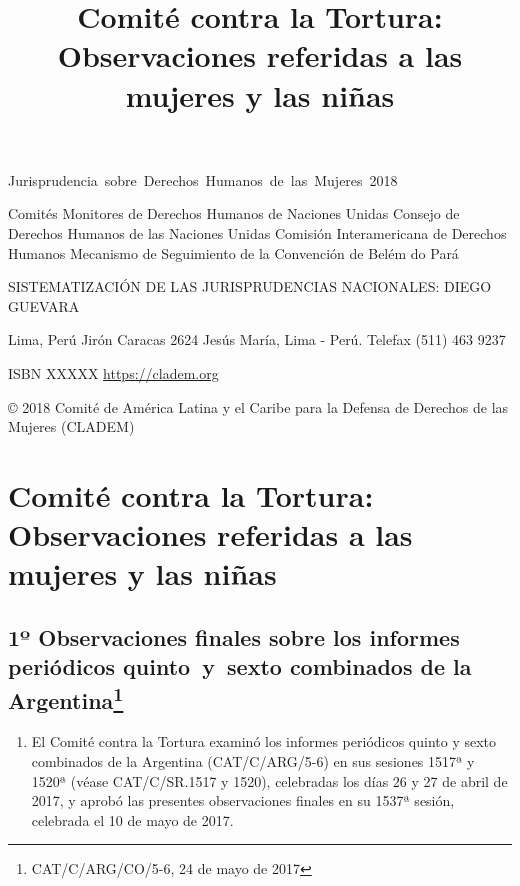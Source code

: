 \documentclass[10pt,twoside,spanish,a5paper,]{book}
\title{Comité contra la Tortura: Observaciones referidas a las mujeres y las
niñas}
\date{}
\providecommand{\tightlist}{%
  \setlength{\itemsep}{0pt}\setlength{\parskip}{0pt}}
\newcommand{\copyleft}{\reflectbox{©}}
\begin{document}
\maketitle

\newpage
\thispagestyle{empty}

\begin{flushleft}\hbox{\Large{Jurisprudencia sobre Derechos Humanos de las Mujeres 2018}}

Comités Monitores de Derechos Humanos de Naciones Unidas
Consejo de Derechos Humanos de las Naciones Unidas
Comisión Interamericana de Derechos Humanos
Mecanismo de Seguimiento de la Convención de Belém do Pará

SISTEMATIZACIÓN DE LAS JURISPRUDENCIAS NACIONALES: DIEGO GUEVARA

Lima, Perú
Jirón Caracas 2624 Jesús María, Lima - Perú. Telefax (511) 463 9237

\vfill
\copyleft  \the\year ISBN XXXXX
\url{https://cladem.org}

© 2018 Comité de América Latina y el Caribe para la Defensa de Derechos de las Mujeres (CLADEM)

\end{flushleft}
\newpage

{
\setcounter{tocdepth}{2}
\tableofcontents
}
\hypertarget{comituxe9-contra-la-tortura-observaciones-referidas-a-las-mujeres-y-las-niuxf1as}{%
\chapter{Comité contra la Tortura: Observaciones referidas a las mujeres
y las
niñas}\label{comituxe9-contra-la-tortura-observaciones-referidas-a-las-mujeres-y-las-niuxf1as}}

\hypertarget{uxba-observaciones-finales-sobre-los-informes-periuxf3dicos-quintoysexto-combinados-de-la-argentina50}{%
\section[1º Observaciones finales sobre los informes periódicos
quinto~y~sexto combinados de la Argentina]{\texorpdfstring{1º
Observaciones finales sobre los informes periódicos quinto~y~sexto
combinados de la Argentina\footnote{CAT/C/ARG/CO/5-6, 24 de mayo de 2017}}{1º Observaciones finales sobre los informes periódicos quinto~y~sexto combinados de la Argentina}}\label{uxba-observaciones-finales-sobre-los-informes-periuxf3dicos-quintoysexto-combinados-de-la-argentina50}}

\begin{enumerate}
\def\labelenumi{\arabic{enumi}.}
\tightlist
\item
  El Comité contra la Tortura examinó los informes periódicos quinto y
  sexto combinados de la Argentina (CAT/C/ARG/5-6) en sus sesiones 1517ª
  y 1520ª (véase CAT/C/SR.1517 y 1520), celebradas los días 26 y 27 de
  abril de 2017, y aprobó las presentes observaciones finales en su
  1537ª sesión, celebrada el 10 de mayo de 2017.
\end{enumerate}
\end{document}
